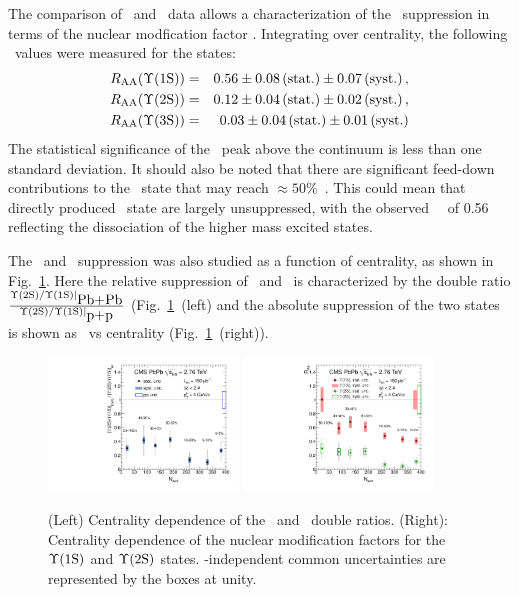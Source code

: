 The comparison of \pp\ and \PbPb\ data allows a characterization of the \PgU\ suppression
in terms of the nuclear modfication factor \Raa.
Integrating over centrality, the following \Raa\ values were measured for the \PgUn states:
\begin{eqnarray}
R_\mathrm{AA} (\Upsilon\mathrm{(1S)}) &=& 0.56 \pm 0.08\,\mbox{(stat.)} \pm 0.07\,\mbox{(syst.)} \,, \\
R_\mathrm{AA} (\Upsilon\mathrm{(2S)}) &=& 0.12 \pm 0.04\,\mbox{(stat.)} \pm 0.02\,\mbox{(syst.)} \,, \nonumber \\
R_\mathrm{AA} (\Upsilon\mathrm{(3S)}) &=& 0.03 \pm 0.04\,\mbox{(stat.)} \pm 0.01\,\mbox{(syst.)}  \nonumber\\
\end{eqnarray}
The statistical significance of the \PgUc\ peak above the continuum is less than one standard deviation.
It should also be noted that there are significant feed-down contributions to
the \PgUa\ state that may reach $\approx 50\%$~\cite{Affolder:1999wm, Aaij:2012se}.
This could mean that directly produced \PgUa\ state are largely unsuppressed, with
the observed \PgUa\ \Raa\ of 0.56 reflecting the dissociation of the higher mass excited states.

The \PgUa\ and \PgUb\ suppression was also studied as a function of centrality,
as shown in Fig.~\ref{fig:GR:centrality}.
Here the relative suppression of \PgUa\ and \PgUb\ is characterized by
the double ratio $\frac{\Upsilon\mathrm{(2S)}/\Upsilon\mathrm{(1S)}|_{\mbox{Pb+Pb}}}{\Upsilon\mathrm{(2S)}/\Upsilon\mathrm{(1S)}|_{\mbox{p+p}}}$
(Fig.~\ref{fig:GR:centrality}~(left) and the absolute suppression
of the two states is shown as \Raa\ vs centrality (Fig.~\ref{fig:GR:centrality}~(right)).

\begin{figure}[t]
\begin{center}
   \includegraphics[width=0.45\textwidth]{qqbarfigures/chi2VsCent}
   \includegraphics[width=0.45\textwidth]{qqbarfigures/RaaPt4}
  \caption{(Left) Centrality dependence of the \PgUa\ and \PgUb\ double ratios.  (Right):
Centrality dependence of the nuclear modification factors for the $\Upsilon\mathrm{(1S)}$ and $\Upsilon\mathrm{(2S)}$ states.
\npart-independent common uncertainties are represented by the boxes at unity.}
\label{fig:GR:centrality}
\end{center}
\end{figure}

